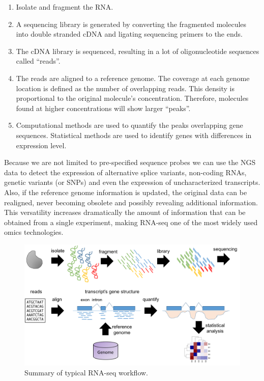 \documentclass[]{book}
\theoremstyle{definition}
\theoremstyle{definition}
\theoremstyle{definition}
\theoremstyle{remark}
\begin{document}
\begin{enumerate}
\def\labelenumi{\arabic{enumi}.}
\item
  Isolate and fragment the RNA.
\item
  A sequencing library is generated by converting the fragmented
  molecules into double stranded cDNA and ligating sequencing primers to
  the ends.
\item
  The cDNA library is sequenced, resulting in a lot of oligonucleotide
  sequences called ``reads''.
\item
  The reads are aligned to a reference genome. The coverage at each
  genome location is defined as the number of overlapping reads. This
  density is proportional to the original molecule's concentration.
  Therefore, molecules found at higher concentrations will show larger
  ``peaks''.
\item
  Computational methods are used to quantify the peaks overlapping gene
  sequences. Statistical methods are used to identify genes with
  differences in expression level.
\end{enumerate}

Because we are not limited to pre-specified sequence probes we can use
the NGS data to detect the expression of alternative splice variants,
non-coding RNAs, genetic variants (or SNPs) and even the expression of
uncharacterized transcripts. Also, if the reference genome information
is updated, the original data can be realigned, never becoming obsolete
and possibly revealing additional information. This versatility
increases dramatically the amount of information that can be obtained
from a single experiment, making RNA-seq one of the most widely used
omics technologies.

\begin{figure}
\includegraphics[width=18.49in]{pic/ngs_rnaseq} \caption{Summary of typical RNA-seq workflow.}\label{fig:ngs-rnaseq}
\end{figure}
\end{document}
